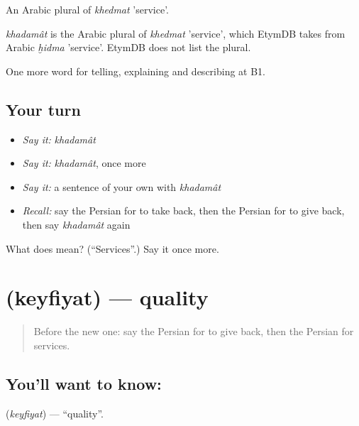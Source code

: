 An Arabic plural of \emph{khedmat} 'service'.

\begin{cousinweb}
\emph{khadamât} is the Arabic plural of \emph{khedmat} 'service', which EtymDB takes from Arabic \emph{ḫidma} 'service'. EtymDB does not list the plural.
\end{cousinweb}

\begin{grammarlens}[title={What you've built}]
One more word for telling, explaining and describing at B1.
\end{grammarlens}

\subsection*{Your turn}
\begin{itemize}
\raggedright
  \item \emph{Say it:} \emph{khadamât}
  \item \emph{Say it:} \emph{khadamât}, once more
  \item \emph{Say it:} a sentence of your own with \emph{khadamât}
  \item \emph{Recall:} say the Persian for to take back, then the Persian for to give back, then say \emph{khadamât} again
\end{itemize}

\begin{tcolorbox}[breakable,colback=teal!4,colframe=teal!35!black,title={Before you move on}]
What does  mean? (\textquotedblleft{}Services\textquotedblright{}.) Say it once more.
\end{tcolorbox}
\section[\texorpdfstring{\fa{کیفیت} (keyfiyat)}{کیفیت (keyfiyat)}]{ (keyfiyat) — quality}

\label{lesson:FA-C443-keyfiyat}



\begin{quote}
Before the new one: say the Persian for to give back, then the Persian for services.
\end{quote}

\subsection*{You'll want to know: }
\textbf{} (\emph{keyfiyat}) — \textquotedblleft{}quality\textquotedblright{}.

